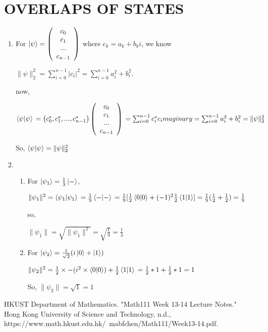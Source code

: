 \documentclass{article}
\begin{document}
\section*{OVERLAPS OF STATES}
\begin{enumerate}
    \item For $\ket{\psi}=\left(\begin{array}{c}
        c_0\\c_1\\...\\c_{n-1}
    \end{array}\right)$
    where $c_k=a_k+b_ki$,
    we know 
    
    $\lVert\psi\rVert^2_2 = \sum_{i=0}^{n-1}|c_i|^2=\sum_{i=0}^{n-1}a_i^2+b_i^2$.

    now,


    $\braket{\psi|\psi}
    \\=\left(c_0^*,c_1^*,...,c_{n-1}^*\right)\left(\begin{array}{c}
        c_0\\c_1\\...\\c_{n-1}
    \end{array}\right)
    \\=\sum_{i=0}^{n-1}c_i^*c_imaginary
    \\=\sum_{i=0}^{n-1}a_i^2+b_i^2
    \\=\lVert\psi\rVert^2_2
    $

    So, $\braket{\psi|\psi}=\lVert\psi\rVert^2_2$
    \item 
    \begin{enumerate}
        \item For $\ket{\psi_1}=\frac{1}{3}\ket{-}$,
        
        $\lVert\psi_1\rVert^2
        \\=\braket{\psi_1|\psi_1}
        \\=\frac{1}{9}\braket{-|-}
        \\=\frac{1}{9}[\frac{1}{2}\braket{0|0}+(-1)^2\frac{1}{2}\braket{1|1}]
        \\=\frac{1}{9}(\frac{1}{2}+\frac{1}{2})
        \\=\frac{1}{9}$

        so,

        $\lVert\psi_1\rVert=\sqrt{\lVert\psi_1\rVert^2}=\sqrt{\frac{1}{9}}=\frac{1}{3}$
        
        \item For $\ket{\psi_2}=\frac{1}{\sqrt{2}}(i\ket{0}+\ket{1})$
        
        $\lVert\psi_2\rVert^2
        \\=\frac{1}{2}\times -(i^2\times\braket{0|0})+\frac{1}{2}\braket{1|1}
        \\=\frac{1}{2}*1+\frac{1}{2}*1
        \\=1
        $

        So, $\lVert\psi_2\rVert=\sqrt{1}=1$
    \end{enumerate}
\end{enumerate}
\begin{thebibliography}{99}
    HKUST Department of Mathematics.
    "Math111 Week 13-14 Lecture Notes."
    Hong Kong University of Science and Technology, n.d.,
    https://www.math.hkust.edu.hk/~mabfchen/Math111/Week13-14.pdf.
\end{thebibliography}
\end{document}
